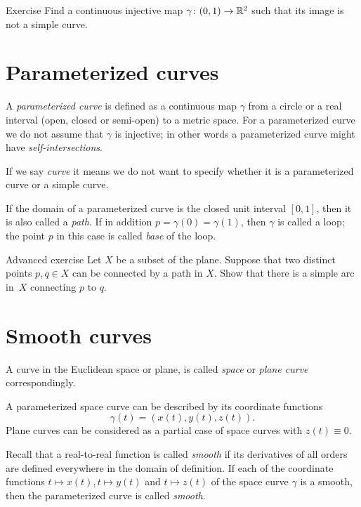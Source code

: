 \begin{thm}{Exercise}\label{ex:9}
Find a continuous injective map $\gamma\colon(0,1)\to\mathbb{R}^2$ such that its image is not a simple curve.
\end{thm}


\section*{Parameterized curves}

A \emph{parameterized curve} is defined as a continuous map $\gamma$ from a circle or a real interval (open, closed or semi-open) to a metric space. 
For a parameterized curve we do not assume that $\gamma$ is injective; in other words a parameterized curve might have \emph{self-intersections}.

If we say \emph{curve} it means we do not want to specify whether it is a parameterized curve or a simple curve.

If the domain of a parameterized curve is the closed unit interval $[0,1]$, then it is also called a \emph{path}.
If in addition $p=\gamma(0)=\gamma(1)$, then $\gamma$ is called a loop;
the point $p$ in this case is called \emph{base} of the loop.

\begin{thm}{Advanced exercise}
Let $X$ be a subset of the plane.
Suppose that two distinct points $p,q\in X$ can be connected by a path in $X$.
Show that there is a simple arc in~$X$ connecting $p$ to $q$.
\end{thm}

\section*{Smooth curves}

A curve in the Euclidean space or plane, is called \emph{space} or \emph{plane curve} correspondingly.

A parameterized space curve can be described by its coordinate functions 
\[\gamma(t)=(x(t),y(t),z(t)).\]
Plane curves can be considered as a partial case of space curves with $z(t)\equiv 0$.

Recall that a real-to-real function is called \emph{smooth} if its derivatives of all orders are defined everywhere in the domain of definition.  
If each of the coordinate functions $t\mapsto x(t),t\mapsto y(t)$ and $t\mapsto z(t)$ of the space curve $\gamma$ is a smooth, then the parameterized curve is called \emph{smooth}.

